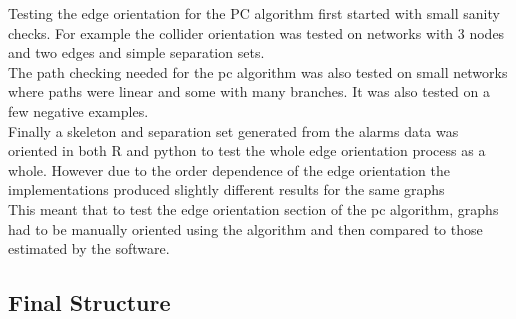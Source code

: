 \documentclass{article}
\begin{document}
Testing the edge orientation for the PC algorithm first started with small sanity checks. For example the collider orientation was tested on networks with 3 nodes and two edges and simple separation sets.\\

The path checking needed for the pc algorithm was also  tested on small networks where paths were linear and some with many branches. It was also tested on a few negative examples.\\

Finally a skeleton and separation set generated from the alarms data was oriented in both R and python to test the whole edge orientation process as a whole. However due to the order dependence of the edge orientation the implementations produced slightly different results for the same graphs\\

This meant that to test the edge orientation section of the pc algorithm, graphs had to be manually oriented using the algorithm and then compared to those estimated by the software.\\


\subsection{Final Structure}
\end{document}

